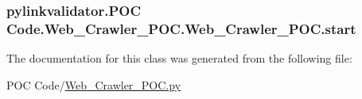 \subsubsection[{start}]{\setlength{\rightskip}{0pt plus 5cm}pylinkvalidator.\+P\+OC Code.\+Web\+\_\+\+Crawler\+\_\+\+P\+O\+C.\+Web\+\_\+\+Crawler\+\_\+\+P\+O\+C.\+start}\hypertarget{classpylinkvalidator_1_1_p_o_c_01_code_1_1_web___crawler___p_o_c_1_1_web___crawler___p_o_c_a081769cb20d863382f36364a61c8060b}{}\label{classpylinkvalidator_1_1_p_o_c_01_code_1_1_web___crawler___p_o_c_1_1_web___crawler___p_o_c_a081769cb20d863382f36364a61c8060b}


The documentation for this class was generated from the following file\+:\begin{DoxyCompactItemize}
\item 
P\+O\+C Code/\hyperlink{_web___crawler___p_o_c_8py}{Web\+\_\+\+Crawler\+\_\+\+P\+O\+C.\+py}\end{DoxyCompactItemize}
